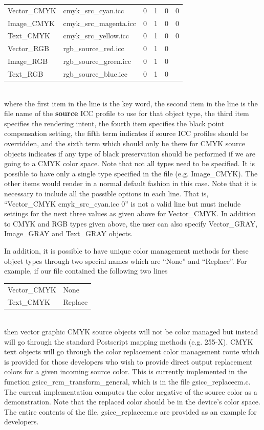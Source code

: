 \documentclass[12pt,notitlepage]{article}
\begin{document}
\begin{tabular}{llllll}
Vector\_CMYK & cmyk\_src\_cyan.icc	& 0 & 1 & 0 & 0 \\
Image\_CMYK	& cmyk\_src\_magenta.icc &	0 & 1 & 0 & 0  \\
Text\_CMYK	& cmyk\_src\_yellow.icc	 & 0 & 1 & 0 & 0  \\
Vector\_RGB &	rgb\_source\_red.icc	& 0 & 1 & 0 & \\
Image\_RGB &	rgb\_source\_green.icc	& 0 & 1 & 0 & \\
Text\_RGB & rgb\_source\_blue.icc & 0 & 1 & 0 & \\
\end{tabular}\\

\noindent where the first item in the line is the key word, the second item in the line is the file name of the {\bf source} ICC profile to use for that object type, the third item specifies the rendering intent, the fourth item specifies the black point compensation setting, the fifth term indicates if source ICC profiles should be overridden, and the sixth term which should only be there for CMYK source objects indicates if any type of black preservation should be performed if we are going to a CMYK color space.  Note that not all types need to be specified.  It is possible to have only a single type specified in the file (e.g. Image\_CMYK).  The other items would render in a normal default fashion in this case.  Note that it is necessary to include all the possible options in each line.    That is, ``Vector\_CMYK  cmyk\_src\_cyan.icc 0'' is not a valid line but must include settings for the next three values as given above for Vector\_CMYK.  In addition to CMYK and RGB types given above, the user can also specify Vector\_GRAY, Image\_GRAY and Text\_GRAY objects.

In addition, it is possible to have unique color management methods for these object types through two special names which are ``None'' and ``Replace''.   For example, if our file contained the following two lines\\

\begin{tabular}{ll}
Vector\_CMYK & None \\
Text\_CMYK	& Replace  \\
\end{tabular}\\

\noindent then vector graphic CMYK source objects will not be color managed but instead will go through the standard Postscript mapping methods (e.g. 255-X).   CMYK text objects will go through the color replacement color management route which is provided for those developers who wish to provide direct output replacement colors for a given incoming source color.  This is currently implemented in the function gsicc\_rcm\_transform\_general, which is in the file gsicc\_replacecm.c.  The current implementation computes the color negative of the source color as a demonstration.  Note that the replaced color should be in the device's color space.   The entire contents of the file, gsicc\_replacecm.c are provided as an example for developers.
\end{document}
